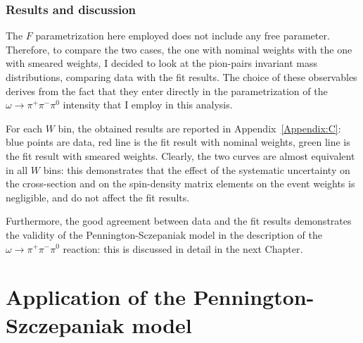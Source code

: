 \documentclass[a4paper,10pt]{report}
\newcommand{\decay}{$\omega \rightarrow \pi^+ \pi^- \pi^0$ }
\begin{document}
\subsection{Results and discussion}

The $F$ parametrization here employed does not include any free parameter. Therefore, to compare the two cases, the one with nominal weights with the one with smeared weights, I decided to look at the pion-pairs invariant mass distributions, comparing data with the fit results.
The choice of these observables derives from the fact that they enter directly in the parametrization of the \decay intensity that I employ in this analysis.

For each $W$ bin, the obtained results are reported in Appendix~\ref{Appendix:C}: blue points are data, red line is the fit result with nominal weights, green line is the fit result with smeared weights. 
Clearly, the two curves are almost equivalent in all $W$ bins: this demonstrates that the effect of the systematic uncertainty on the cross-section and on the spin-density matrix elements on the event weights is negligible, and do not affect the fit results.

Furthermore, the good agreement between data and the fit results demonstrates the validity of the Pennington-Sczepaniak model in the description of the \decay reaction: this is discussed in detail in the next Chapter.


\chapter{Application of the Pennington-Szczepaniak model}
\end{document}
